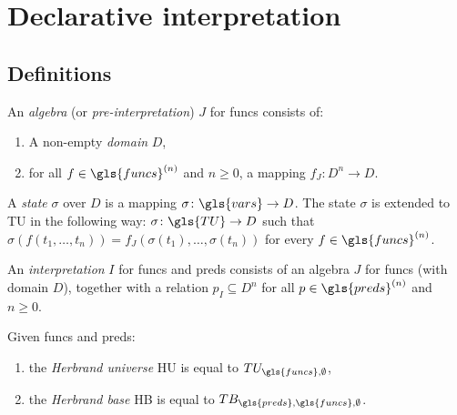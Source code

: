 \chapter{Declarative interpretation}

\section{Definitions}

\begin{dfn}[Algebra]
    An \emph{algebra} (or \emph{pre-interpretation}) \(J\) for \gls{funcs} consists of:
    \begin{enumerate}
        \item A non-empty \emph{domain} \(D\),
        \item for all \(f \in \gls{funcs}^{(n)}\) and \(n \ge 0\), a mapping \(f_J \colon D^n \to D\). 
    \end{enumerate}
    A \emph{state} \(\sigma\) over \(D\) is a mapping \(\sigma \colon \gls{vars} \to D\).
    The state \(\sigma\) is extended to \gls{TU} in the following way: \(\sigma \colon \gls{TU} \to D\) such that \(\sigma(f(t_1,\dotsc,t_n)) = f_J(\sigma(t_1),\dotsc,\sigma(t_n))\) for every \(f \in \gls{funcs}^{(n)}\).
\end{dfn}

\begin{dfn}
    An \emph{interpretation} \(I\) for \gls{funcs} and \gls{preds} consists of an algebra \(J\) for \gls{funcs} (with domain \(D\)), together with a relation \(p_I \subseteq D^n\) for all \(p \in \gls{preds}^{(n)}\) and \(n \ge 0\).
\end{dfn}

\begin{dfn}
    Given \gls{funcs} and \gls{preds}:
    \begin{enumerate}
        \item the \emph{Herbrand universe} \gls{HU} is equal to \(TU_{\gls{funcs},\emptyset}\),
        \item the \emph{Herbrand base} \gls{HB} is equal to \(TB_{\gls{preds},\gls{funcs},\emptyset}\).
    \end{enumerate}
\end{dfn}

